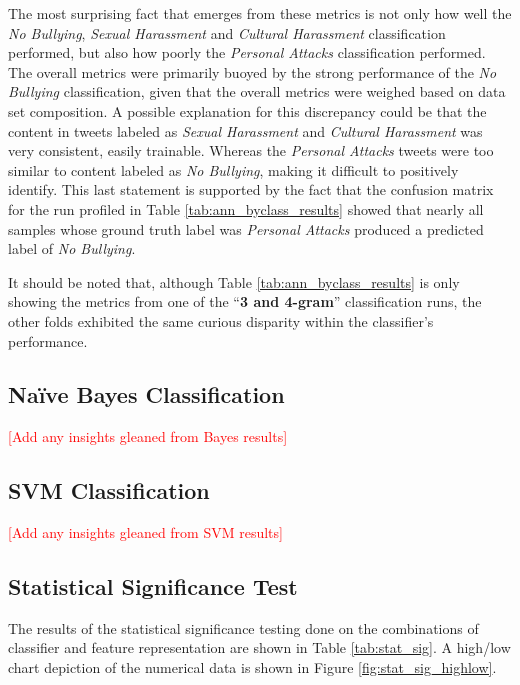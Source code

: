 \documentclass[conference]{sig-alternate-05-2015}
\newcommand{\todo}[1]{{\textcolor{red}{[#1]}}}
\begin{document}
The most surprising fact that emerges from these metrics is not only how well
the \textit{No Bullying}, \textit{Sexual Harassment} and \textit{Cultural
Harassment} classification performed, but also how poorly the \textit{Personal
Attacks} classification performed. The overall metrics were primarily buoyed by
the strong performance of the \textit{No Bullying} classification, given that
the overall metrics were weighed based on data set composition. A possible
explanation for this discrepancy could be that the content in tweets labeled
as \textit{Sexual Harassment} and \textit{Cultural Harassment} was very
consistent, easily trainable. Whereas the \textit{Personal Attacks} tweets were
too similar to content labeled as \textit{No Bullying}, making it difficult to
positively identify. This last statement is supported by the fact that the
confusion matrix for the run profiled in Table \ref{tab:ann_byclass_results}
showed that nearly all samples whose ground truth label was \textit{Personal
Attacks} produced a predicted label of \textit{No Bullying}.\par

It should be noted that, although Table \ref{tab:ann_byclass_results} is only
showing the metrics from one of the ``\textbf{3 and 4-gram}'' classification
runs, the other folds exhibited the same curious disparity within the
classifier's performance.\par

\subsection{Na\"ive Bayes Classification}\label{subsec:bayes_discussion}

\todo{Add any insights gleaned from Bayes results}

\subsection{SVM Classification}\label{subsec:svm_discussion}

\todo{Add any insights gleaned from SVM results}

\subsection{Statistical Significance Test}\label{subsec:stat_sig_discussion}

The results of the statistical significance testing done on the combinations of
classifier and feature representation are shown in Table \ref{tab:stat_sig}. A
high/low chart depiction of the numerical data is shown in Figure
\ref{fig:stat_sig_highlow}.
\end{document}
